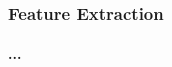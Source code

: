 \documentclass[10pt,usepdftitle=false,aspectratio=169]{beamer}
\begin{document}








\begin{frame}\frametitle{Feature Extraction}
	\framesubtitle{ ... }%

	
	
	
	
\end{frame}
\end{document}
